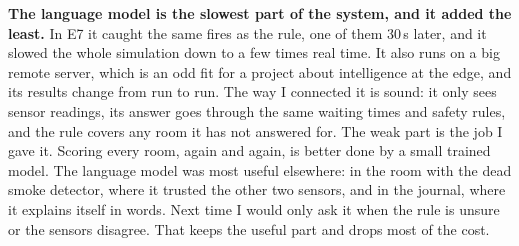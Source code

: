 \textbf{The language model is the slowest part of the system, and it added the
least.} In E7 it caught the same fires as the rule, one of them 30\,s later, and
it slowed the whole simulation down to a few times real time. It also runs on a
big remote server, which is an odd fit for a project about intelligence at the
edge, and its results change from run to run. The way I connected it is sound: it
only sees sensor readings, its answer goes through the same waiting times and
safety rules, and the rule covers any room it has not answered for. The weak part
is the job I gave it. Scoring every room, again and again, is better done by a
small trained model. The language model was most useful elsewhere: in the room
with the dead smoke detector, where it trusted the other two sensors, and in the
journal, where it explains itself in words. Next time I would only ask it when the
rule is unsure or the sensors disagree. That keeps the useful part and drops most
of the cost.

